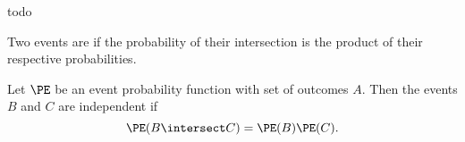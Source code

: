 


todo


Two events are 
if the probability of
their intersection is
the product of their respective
probabilities.


Let $\PE$ be an
event probability function
with set of outcomes $A$.
Then the events $B$ and $C$
are independent if
\[
  \PE(B \intersect C) = \PE(B)\PE(C).
\]
